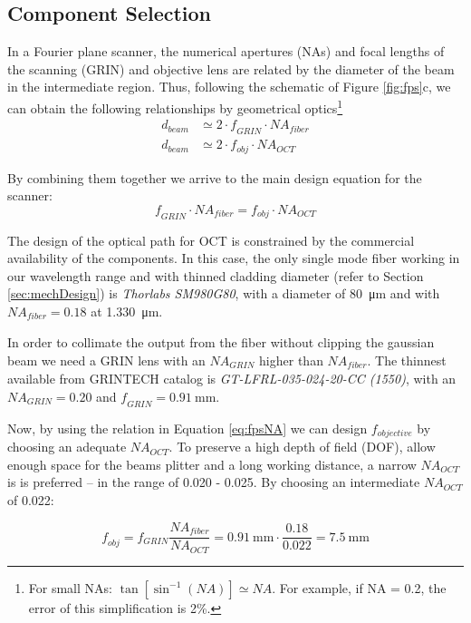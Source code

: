 \subsection*{Component Selection}

In a Fourier plane scanner, the numerical apertures (NAs) and focal lengths of the scanning (GRIN) and objective lens are related by the diameter of the beam in the intermediate region. Thus, following the schematic of Figure \ref{fig:fps}c, we can obtain the following relationships by geometrical optics\footnote{For small NAs: $\tan[	\sin^{-1}(\mathit{NA})] \simeq \mathit{NA} $. For example, if NA = 0.2, the error of this simplification is 2\%. }
\begin{align}
d_{beam} &\simeq 2\cdot \mathit{f_{GRIN}}\cdot \mathit{NA_{fiber}} \\
d_{beam} &\simeq 2 \cdot f_{obj}\cdot \mathit{NA_{OCT}}
\label{eq:fpsNA}
\end{align}

By combining them together we arrive to the main design equation for the scanner:
\begin{equation}
\mathit{f_{GRIN}} \cdot \mathit{NA_{fiber}} = f_{obj} \cdot \mathit{NA_{OCT}}
\end{equation}

The design of the optical path for OCT is constrained by the commercial availability of the components. In this case, the only single mode fiber working in our wavelength range and with thinned cladding diameter (refer to Section \ref{sec:mechDesign}) is \textit{Thorlabs SM980G80}, with a diameter of \SI{80}{\micro\meter} and with $\mathit{NA_{fiber}} = 0.18$ at \SI{1.330}{\micro\meter}. 

In order to collimate the output from the fiber without clipping the gaussian beam we need a GRIN lens with an $\mathit{NA_{GRIN}}$ higher than $\mathit{NA_{fiber}}$. The thinnest available from GRINTECH catalog is \textit{GT-LFRL-035-024-20-CC (1550)}, with an $\mathit{NA_{GRIN}} = 0.20$ and $\mathit{f_{GRIN}} = \SI{0.91}{\milli\meter}$. 

Now, by using the relation in Equation \ref{eq:fpsNA} we can design $f_{objective}$ by choosing an adequate $\mathit{NA_{OCT}}$. To preserve a high depth of field (DOF), allow enough space for the beams plitter and a long working distance, a narrow $\mathit{NA_{OCT}}$ is is preferred -- in the range of 0.020 - 0.025. By choosing an intermediate $\mathit{NA_{OCT}}$ of 0.022:

\begin{equation}
\mathit{f_{obj}} = f_{GRIN} \frac{\mathit{NA_{fiber}}}{\mathit{NA_{OCT}} } = \SI{0.91}{\milli\meter} \cdot \frac{0.18}{0.022} = \SI{7.5}{\milli\meter}
\end{equation}


